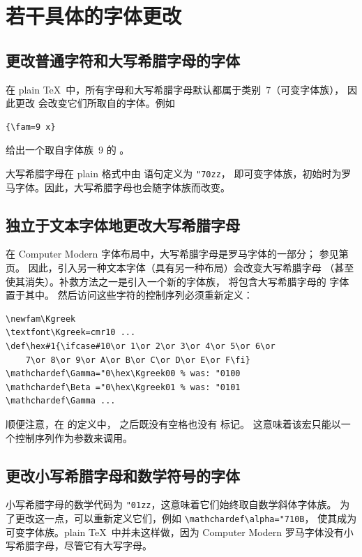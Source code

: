 \documentclass[a4paper]{rapport3}
\def\alt{}\def\altt{}%
\def\hex{{\tt"}}
\begin{document}
\section{若干具体的字体更改}

\subsection{更改普通字符和大写希腊字母的字体}

在 plain \TeX\ 中，所有字母和大写希腊字母默认都属于类别~7（可变字体族），
因此更改  会改变它们所取自的字体。例如
\begin{verbatim}
{\fam=9 x}
\end{verbatim}
 给出一个取自字体族~9 的 。

大写希腊字母在 plain 格式中由  语句定义为 \verb>"70zz>，
即可变字体族，初始时为罗马字体。因此，大写希腊字母也会随字体族而改变。

\subsection{独立于文本字体地更改大写希腊字母}

在 Computer Modern 字体布局中，大写希腊字母是罗马字体的一部分；
参见第~\pageref{cmr:table} 页。\alt
因此，引入另一种文本字体（具有另一种布局）会改变大写希腊字母
（甚至使其消失）。补救方法之一是引入一个新的字体族，
将包含大写希腊字母的  字体置于其中。
然后访问这些字符的控制序列必须重新定义：
\begin{verbatim}
\newfam\Kgreek 
\textfont\Kgreek=cmr10 ...
\def\hex#1{\ifcase#10\or 1\or 2\or 3\or 4\or 5\or 6\or
    7\or 8\or 9\or A\or B\or C\or D\or E\or F\fi}
\mathchardef\Gamma="0\hex\Kgreek00 % was: "0100
\mathchardef\Beta ="0\hex\Kgreek01 % was: "0101
\mathchardef\Gamma ...
\end{verbatim}
顺便注意，在  的定义中， 之后既没有空格也没有  标记。
这意味着该宏只能以一个控制序列作为参数来调用。

\subsection{更改小写希腊字母和数学符号的字体}

小写希腊字母的数学代码为 \verb>"01zz>，这意味着它们始终取自数学斜体字体族。
为了更改这一点，可以重新定义它们，例如 \verb.\mathchardef\alpha="710B.，
使其成为可变字体族。plain \TeX\ 中并未这样做，因为 Computer Modern
罗马字体没有小写希腊字母，尽管它有大写字母。
\end{document}
